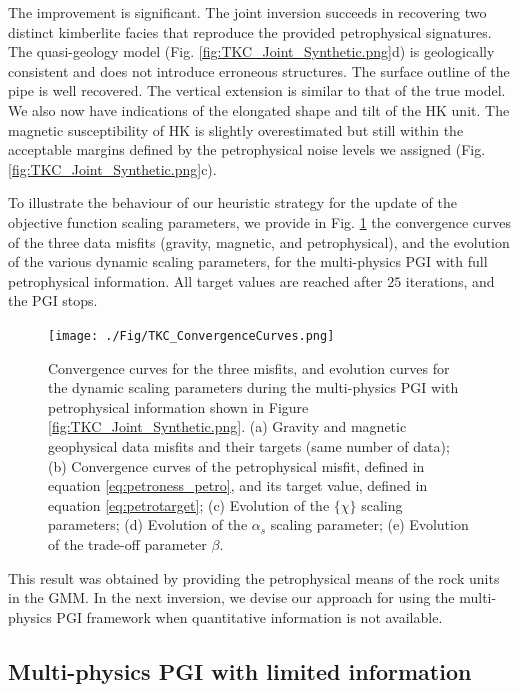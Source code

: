 \documentclass[extra, mreferee]{gji_joint} %
\begin{document}
The improvement is significant. The joint inversion succeeds in recovering two distinct kimberlite facies that reproduce the provided petrophysical signatures. The quasi-geology model (Fig. \ref{fig:TKC_Joint_Synthetic.png}d) is geologically consistent and does not introduce erroneous structures. The surface outline of the pipe is well recovered. The vertical extension is similar to that of the true model. We also now have indications of the elongated shape and tilt of the HK unit. The magnetic susceptibility of HK is slightly overestimated but still within the acceptable margins defined by the petrophysical noise levels we assigned (Fig. \ref{fig:TKC_Joint_Synthetic.png}c).

To illustrate the behaviour of our heuristic strategy for the update of the objective function scaling parameters, we provide in Fig. \ref{fig:TKC_ConvergenceCurves.png} the convergence curves of the three data misfits (gravity, magnetic, and petrophysical), and the evolution of the various dynamic scaling parameters, for the multi-physics PGI with full petrophysical information. All target values are reached after $25$ iterations, and the PGI stops.

\begin{figure}
\centering
\texttt{[image: ./Fig/TKC\_ConvergenceCurves.png]}
\caption{Convergence curves for the three misfits, and evolution curves for the dynamic scaling parameters during the multi-physics PGI with petrophysical information shown in Figure \ref{fig:TKC_Joint_Synthetic.png}. (a) Gravity and magnetic geophysical data misfits and their targets (same number of data); (b) Convergence curves of the petrophysical misfit, defined in equation \eqref{eq:petroness_petro}, and its target value, defined in equation \eqref{eq:petrotarget}; (c) Evolution of the $\{\chi\}$ scaling parameters; (d) Evolution of the $\alpha_s$ scaling parameter; (e) Evolution of the trade-off parameter $\beta$.}
\label{fig:TKC_ConvergenceCurves.png}
\end{figure}


This result was obtained by providing the petrophysical means of the rock units in the GMM. In the next inversion, we devise our approach for using the multi-physics PGI framework when quantitative information is not available.

\subsection{Multi-physics PGI with limited information}
\end{document}
